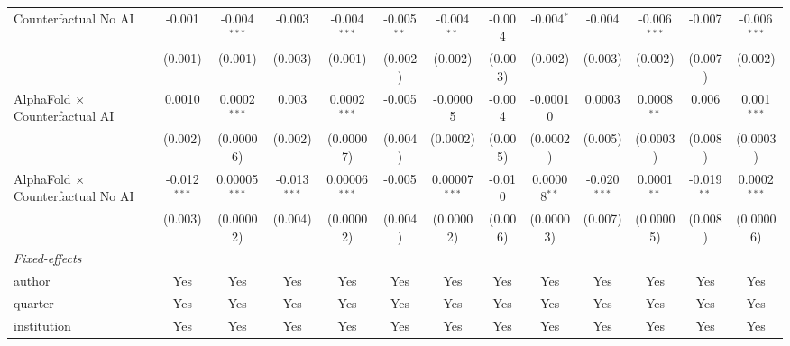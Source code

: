 \begin{tabular}{lcccccccccccc}
   Counterfactual No AI                     & -0.001         & -0.004$^{***}$  & -0.003         & -0.004$^{***}$  & -0.005$^{**}$ & -0.004$^{**}$   & -0.004  & -0.004$^{*}$   & -0.004         & -0.006$^{***}$ & -0.007         & -0.006$^{***}$\\   
                                            & (0.001)        & (0.001)         & (0.003)        & (0.001)         & (0.002)       & (0.002)         & (0.003) & (0.002)        & (0.003)        & (0.002)        & (0.007)        & (0.002)\\   
   AlphaFold $\times$ Counterfactual AI     & 0.0010         & 0.0002$^{***}$  & 0.003          & 0.0002$^{***}$  & -0.005        & -0.00005        & -0.004  & -0.00010       & 0.0003         & 0.0008$^{**}$  & 0.006          & 0.001$^{***}$\\   
                                            & (0.002)        & (0.00006)       & (0.002)        & (0.00007)       & (0.004)       & (0.0002)        & (0.005) & (0.0002)       & (0.005)        & (0.0003)       & (0.008)        & (0.0003)\\   
   AlphaFold $\times$ Counterfactual No AI  & -0.012$^{***}$ & 0.00005$^{***}$ & -0.013$^{***}$ & 0.00006$^{***}$ & -0.005        & 0.00007$^{***}$ & -0.010  & 0.00008$^{**}$ & -0.020$^{***}$ & 0.0001$^{**}$  & -0.019$^{**}$  & 0.0002$^{***}$\\   
                                            & (0.003)        & (0.00002)       & (0.004)        & (0.00002)       & (0.004)       & (0.00002)       & (0.006) & (0.00003)      & (0.007)        & (0.00005)      & (0.008)        & (0.00006)\\   
   \midrule
   \emph{Fixed-effects}\\
   author                                   & Yes            & Yes             & Yes            & Yes             & Yes           & Yes             & Yes     & Yes            & Yes            & Yes            & Yes            & Yes\\  
   quarter                                  & Yes            & Yes             & Yes            & Yes             & Yes           & Yes             & Yes     & Yes            & Yes            & Yes            & Yes            & Yes\\  
   institution                              & Yes            & Yes             & Yes            & Yes             & Yes           & Yes             & Yes     & Yes            & Yes            & Yes            & Yes            & Yes\\  

\end{tabular}
